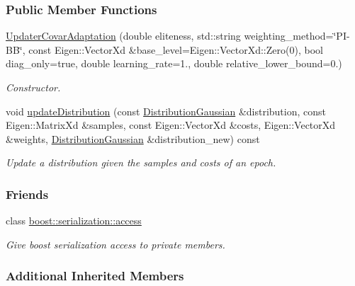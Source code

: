 \subsubsection*{Public Member Functions}
\begin{DoxyCompactItemize}
\item 
\hyperlink{classDmpBbo_1_1UpdaterCovarAdaptation_a33570a5da7912bcc2709355a7fa5d2e6}{Updater\+Covar\+Adaptation} (double eliteness, std\+::string weighting\+\_\+method=\char`\"{}P\+I-\/B\+B\char`\"{}, const Eigen\+::\+Vector\+Xd \&base\+\_\+level=Eigen\+::\+Vector\+Xd\+::\+Zero(0), bool diag\+\_\+only=true, double learning\+\_\+rate=1., double relative\+\_\+lower\+\_\+bound=0.)
\begin{DoxyCompactList}\small\item\em Constructor. \end{DoxyCompactList}\item 
void \hyperlink{classDmpBbo_1_1UpdaterCovarAdaptation_aabb65aaf08049416ed18b294d5fca415}{update\+Distribution} (const \hyperlink{classDmpBbo_1_1DistributionGaussian}{Distribution\+Gaussian} \&distribution, const Eigen\+::\+Matrix\+Xd \&samples, const Eigen\+::\+Vector\+Xd \&costs, Eigen\+::\+Vector\+Xd \&weights, \hyperlink{classDmpBbo_1_1DistributionGaussian}{Distribution\+Gaussian} \&distribution\+\_\+new) const 
\begin{DoxyCompactList}\small\item\em Update a distribution given the samples and costs of an epoch. \end{DoxyCompactList}\end{DoxyCompactItemize}
\subsubsection*{Friends}
\begin{DoxyCompactItemize}
\item 
class \hyperlink{classDmpBbo_1_1UpdaterCovarAdaptation_ac98d07dd8f7b70e16ccb9a01abf56b9c}{boost\+::serialization\+::access}
\begin{DoxyCompactList}\small\item\em Give boost serialization access to private members. \end{DoxyCompactList}\end{DoxyCompactItemize}
\subsubsection*{Additional Inherited Members}


